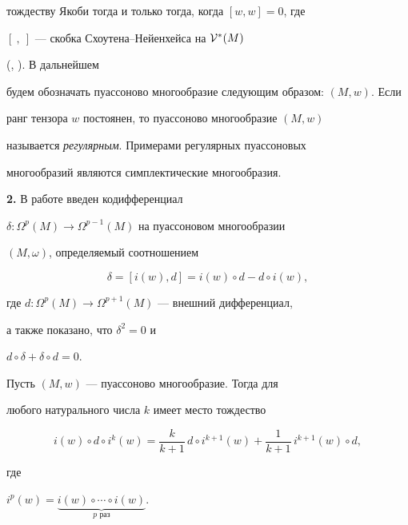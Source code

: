 тождеству Якоби тогда и только тогда, когда $[w,w]=0$, где


$[\ ,\ ]$ --- скобка Схоутена--Нейенхейса на ${\cal V}^*(M)$


(\cite{Li}, \cite{Wein}). В дальнейшем 


будем обозначать пуассоново многообразие следующим образом: $(M,w)$. Если


ранг тензора $w$ постоянен, то пуассоново многообразие $(M,w)$


называется {\it регулярным}. Примерами регулярных пуассоновых


многообразий являются симплектические многообразия.


\medskip


\addtocounter{section}{1}








{\bf 2.} В работе \cite{K} введен кодифференциал


$\delta: \Omega^p(M)\to \Omega^{p-1}(M)$ на пуассоновом многообразии


$(M,\omega)$, определяемый соотношением


$$


\delta=[i(w), d]=i(w)\circ d-d\circ i(w),


$$


где $d:\Omega^p(M)\to \Omega^{p+1}(M)$ --- внешний дифференциал,


а также показано, что $\delta^2=0$ и\linebreak


$d\circ\delta + \delta\circ d=0$.





\begin{props}


Пусть $(M,w)$ --- пуассоново многообразие. Тогда для


любого натурального числа $k$ имеет место тождество


\begin{equation} \label{idin}


i(w) \circ d \circ i^k(w) =


\frac{k}{k+1}\, d\circ i^{k+1}(w) + \frac{1}{k+1}\, i^{k+1}(w) \circ d,


\end{equation}


где


$i^p(w)=\underbrace{i(w)\circ \dotsb \circ i(w)}_{\text{$p$ раз}}$.


\end{props}








